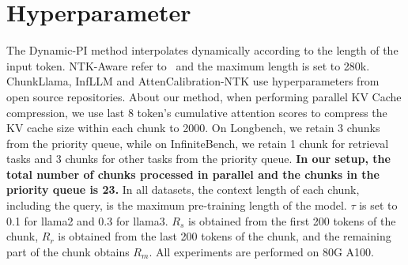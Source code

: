 \section{Hyperparameter}
\label{Hyperparameter}
The Dynamic-PI method interpolates dynamically according to the length of the input token. NTK-Aware refer to~\citep{fixedNTK} and the maximum length is set to 280k. ChunkLlama, InfLLM and AttenCalibration-NTK use hyperparameters from open source repositories. About our method, when performing parallel KV Cache compression, we use last 8 token's cumulative attention scores to compress the KV cache size within each chunk to 2000. On Longbench, we retain 3 chunks from the priority queue, while on InfiniteBench, we retain 1 chunk for retrieval tasks and 3 chunks for other tasks from the priority queue. \textbf{In our setup, the total number of chunks processed in parallel and the chunks in the priority queue is 23.} In all datasets, the context length of each chunk, including the query, is the maximum pre-training length of the model. \( \tau \)  is set to 0.1 for llama2 and 0.3 for llama3. \( R_s \) is obtained from the first 200 tokens of the chunk, \( R_r \) is obtained from the last 200 tokens of the chunk, and the remaining part of the chunk obtains \( R_m \).  All experiments are performed on 80G A100.